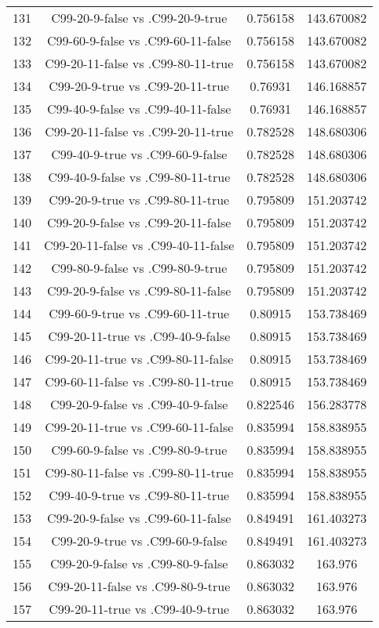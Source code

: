 \documentclass[a4paper,10pt]{article}
\begin{document}
\begin{landscape}
\begin{table}[!htp]
\begin{tabular}{cccc}
131&C99-20-9-false vs .C99-20-9-true&0.756158&143.670082\\
132&C99-60-9-false vs .C99-60-11-false&0.756158&143.670082\\
133&C99-20-11-false vs .C99-80-11-true&0.756158&143.670082\\
134&C99-20-9-true vs .C99-20-11-true&0.76931&146.168857\\
135&C99-40-9-false vs .C99-40-11-false&0.76931&146.168857\\
136&C99-20-11-false vs .C99-20-11-true&0.782528&148.680306\\
137&C99-40-9-true vs .C99-60-9-false&0.782528&148.680306\\
138&C99-40-9-false vs .C99-80-11-true&0.782528&148.680306\\
139&C99-20-9-true vs .C99-80-11-true&0.795809&151.203742\\
140&C99-20-9-false vs .C99-20-11-false&0.795809&151.203742\\
141&C99-20-11-false vs .C99-40-11-false&0.795809&151.203742\\
142&C99-80-9-false vs .C99-80-9-true&0.795809&151.203742\\
143&C99-20-9-false vs .C99-80-11-false&0.795809&151.203742\\
144&C99-60-9-true vs .C99-60-11-true&0.80915&153.738469\\
145&C99-20-11-true vs .C99-40-9-false&0.80915&153.738469\\
146&C99-20-11-true vs .C99-80-11-false&0.80915&153.738469\\
147&C99-60-11-false vs .C99-80-11-true&0.80915&153.738469\\
148&C99-20-9-false vs .C99-40-9-false&0.822546&156.283778\\
149&C99-20-11-true vs .C99-60-11-false&0.835994&158.838955\\
150&C99-60-9-false vs .C99-80-9-true&0.835994&158.838955\\
151&C99-80-11-false vs .C99-80-11-true&0.835994&158.838955\\
152&C99-40-9-true vs .C99-80-11-true&0.835994&158.838955\\
153&C99-20-9-false vs .C99-60-11-false&0.849491&161.403273\\
154&C99-20-9-true vs .C99-60-9-false&0.849491&161.403273\\
155&C99-20-9-false vs .C99-80-9-false&0.863032&163.976\\
156&C99-20-11-false vs .C99-80-9-true&0.863032&163.976\\
157&C99-20-11-true vs .C99-40-9-true&0.863032&163.976\\

\end{tabular}
\end{table}
\end{landscape}
\end{document}
